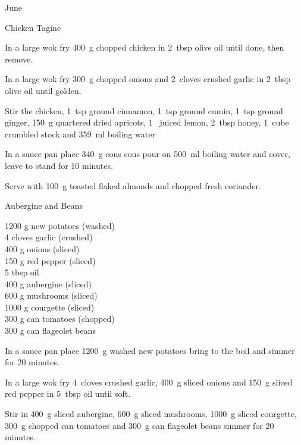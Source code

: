 \begin{menu}{June}
\begin{recipe}{2}{Chicken Tagine}
	
    \begin{instructions}
    \item 
        In a large wok fry
        400~g chopped chicken
        in
        2~tbsp  olive oil
        until done, then remove.
      \item 
        In a large wok fry
        300~g chopped onions
        and
        2~cloves crushed garlic
        in
        2~tbsp  olive oil
        until golden.
      \item 
        Stir the chicken,
        1~tsp  ground cinnamon,
        1~tsp  ground cumin,
        1~tsp  ground ginger,
        150~g quartered dried apricots,
        1~ juiced lemon,
        2~tbsp  honey,
        1~cube crumbled stock
        and
        359~ml  boiling water\item 
    In a
    sauce pan
    place
    340~g  cous cous
    pour on
    500~ml  boiling water
    and cover, leave to stand for 10 minutes.
  \item 
        Serve with
        100~g toasted flaked almonds
        and
         chopped fresh coriander.
      
    \end{instructions}
    \end{recipe}%
  
    \begin{recipe}{2}{Aubergine and Beans}%
		\begin{ingredients}
		1200 g new potatoes (washed) \\
	4 cloves garlic (crushed) \\
	400 g onions (sliced) \\
	150 g red pepper (sliced) \\
	5 tbsp oil  \\
	400 g aubergine (sliced) \\
	600 g mushrooms (sliced) \\
	1000 g courgette (sliced) \\
	300 g can tomatoes (chopped) \\
	300 g can flageolet beans  \\
	
		\end{ingredients}
	
	
    \begin{instructions}
    \item 
    In a sauce pan place
    1200~g washed new potatoes
    bring to the boil and simmer for 20 minutes.
  \item 
        In a large wok fry
        4~cloves crushed garlic,
        400~g sliced onions
        and
        150~g sliced red pepper
        in
        5~tbsp  oil
        until soft.
      \item 
        Stir in
        400~g sliced aubergine,
        600~g sliced mushrooms,
        1000~g sliced courgette,
        300~g chopped can tomatoes
        and
        300~g  can flageolet beans
        simmer for 20 minutes.
      

\end{instructions}
\end{recipe}
\end{menu}
